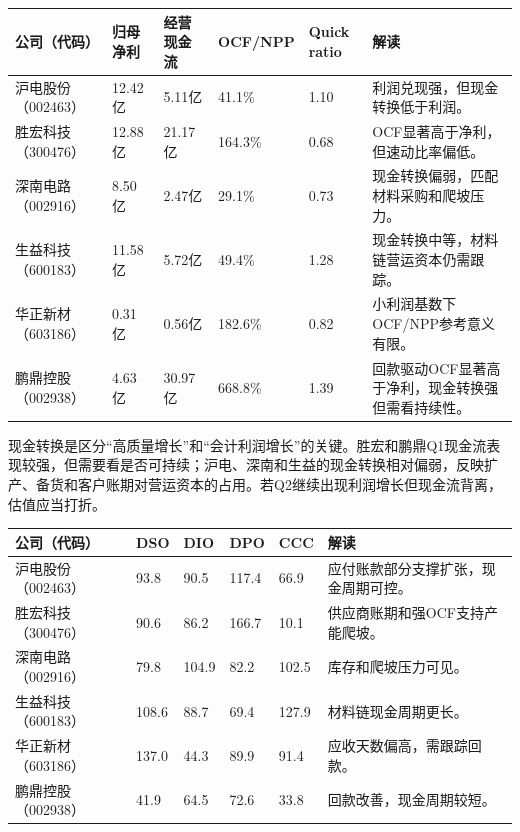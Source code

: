 \begin{exhibitbox}[图表6-6：现金转换和营运资本质量]
\footnotesize
\begin{tabularx}{\textwidth}{L{1.8cm}R{1.7cm}R{1.7cm}R{1.8cm}R{1.6cm}X}
\toprule
\textbf{公司（代码）} & \textbf{归母净利} & \textbf{经营现金流} & \textbf{OCF/NPP} & \textbf{Quick ratio} & \textbf{解读} \\
\midrule
沪电股份（002463） & 12.42亿 & 5.11亿 & 41.1\% & 1.10 & 利润兑现强，但现金转换低于利润。 \\
胜宏科技（300476） & 12.88亿 & 21.17亿 & 164.3\% & 0.68 & OCF显著高于净利，但速动比率偏低。 \\
深南电路（002916） & 8.50亿 & 2.47亿 & 29.1\% & 0.73 & 现金转换偏弱，匹配材料采购和爬坡压力。 \\
生益科技（600183） & 11.58亿 & 5.72亿 & 49.4\% & 1.28 & 现金转换中等，材料链营运资本仍需跟踪。 \\
华正新材（603186） & 0.31亿 & 0.56亿 & 182.6\% & 0.82 & 小利润基数下OCF/NPP参考意义有限。 \\
鹏鼎控股（002938） & 4.63亿 & 30.97亿 & 668.8\% & 1.39 & 回款驱动OCF显著高于净利，现金转换强但需看持续性。 \\
\bottomrule
\end{tabularx}
\end{exhibitbox}

现金转换是区分“高质量增长”和“会计利润增长”的关键。胜宏和鹏鼎Q1现金流表现较强，但需要看是否可持续；沪电、深南和生益的现金转换相对偏弱，反映扩产、备货和客户账期对营运资本的占用。若Q2继续出现利润增长但现金流背离，估值应当打折。

\begin{exhibitbox}[图表6-7：营运资本天数近似值]
\footnotesize
\begin{tabularx}{\textwidth}{L{1.8cm}R{1.5cm}R{1.5cm}R{1.5cm}R{1.6cm}X}
\toprule
\textbf{公司（代码）} & \textbf{DSO} & \textbf{DIO} & \textbf{DPO} & \textbf{CCC} & \textbf{解读} \\
\midrule
沪电股份（002463） & 93.8 & 90.5 & 117.4 & 66.9 & 应付账款部分支撑扩张，现金周期可控。 \\
胜宏科技（300476） & 90.6 & 86.2 & 166.7 & 10.1 & 供应商账期和强OCF支持产能爬坡。 \\
深南电路（002916） & 79.8 & 104.9 & 82.2 & 102.5 & 库存和爬坡压力可见。 \\
生益科技（600183） & 108.6 & 88.7 & 69.4 & 127.9 & 材料链现金周期更长。 \\
华正新材（603186） & 137.0 & 44.3 & 89.9 & 91.4 & 应收天数偏高，需跟踪回款。 \\
鹏鼎控股（002938） & 41.9 & 64.5 & 72.6 & 33.8 & 回款改善，现金周期较短。 \\
\bottomrule
\end{tabularx}
\end{exhibitbox}

